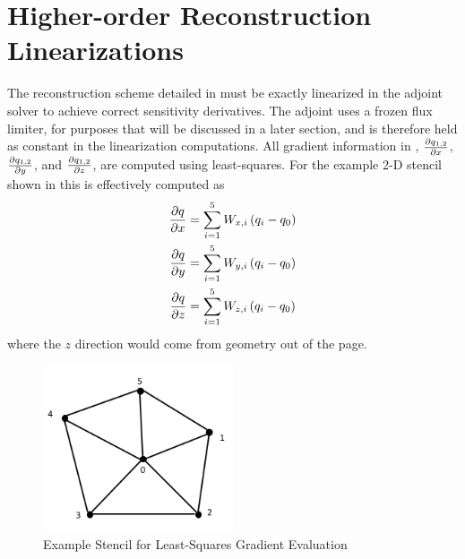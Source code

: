 \section{Higher-order Reconstruction Linearizations}
\label{sec:higher-order-linearizations}

The reconstruction scheme detailed in  must
be exactly linearized in the adjoint solver to achieve correct sensitivity
derivatives. The adjoint uses a frozen flux limiter, for purposes that will be
discussed in a later section, and is therefore held as constant in the
linearization computations.  All gradient information in ,
$\frac{\partial q_{1,2}}{\partial x}$, $\frac{\partial q_{1,2}}{\partial y}$, and $\frac{\partial q_{1,2}}{\partial z}$, are computed using
least-squares.  For the example 2-D stencil shown in 
this is effectively computed as
\begin{equation}
  \begin{aligned}
    \frac{\partial q}{\partial x} &= \sum_{i=1}^{5}{W_{x,i}\left( q_i - q_0 \right)} \\
    \frac{\partial q}{\partial y} &= \sum_{i=1}^{5}{W_{y,i}\left( q_i - q_0 \right)} \\
    \frac{\partial q}{\partial z} &= \sum_{i=1}^{5}{W_{z,i}\left( q_i - q_0 \right)}
  \end{aligned}
  \label{grad-construction}
\end{equation}
where the $z$ direction would come from geometry out of the page.
\begin{figure}[h]
  \centering
  \includegraphics[width=0.5\textwidth]{figures/stencil.png}
  \caption{Example Stencil for Least-Squares Gradient Evaluation}
  \label{fig:lsq-gradients}
\end{figure}
